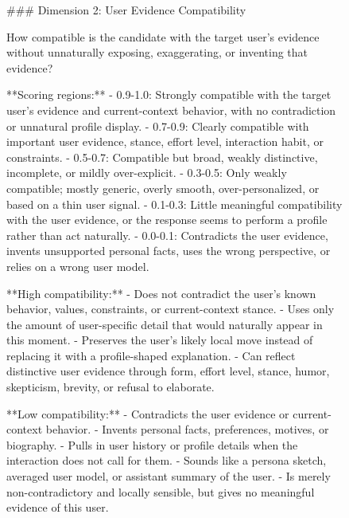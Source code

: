 \begin{figure}[p]
\centering

\begin{promptbox}
### Dimension 2: User Evidence Compatibility

How compatible is the candidate with the target user's evidence without unnaturally exposing, exaggerating, or inventing that evidence?

**Scoring regions:**
- 0.9-1.0: Strongly compatible with the target user's evidence and current-context behavior, with no contradiction or unnatural profile display.
- 0.7-0.9: Clearly compatible with important user evidence, stance, effort level, interaction habit, or constraints.
- 0.5-0.7: Compatible but broad, weakly distinctive, incomplete, or mildly over-explicit.
- 0.3-0.5: Only weakly compatible; mostly generic, overly smooth, over-personalized, or based on a thin user signal.
- 0.1-0.3: Little meaningful compatibility with the user evidence, or the response seems to perform a profile rather than act naturally.
- 0.0-0.1: Contradicts the user evidence, invents unsupported personal facts, uses the wrong perspective, or relies on a wrong user model.

**High compatibility:**
- Does not contradict the user's known behavior, values, constraints, or current-context stance.
- Uses only the amount of user-specific detail that would naturally appear in this moment.
- Preserves the user's likely local move instead of replacing it with a profile-shaped explanation.
- Can reflect distinctive user evidence through form, effort level, stance, humor, skepticism, brevity, or refusal to elaborate.

**Low compatibility:**
- Contradicts the user evidence or current-context behavior.
- Invents personal facts, preferences, motives, or biography.
- Pulls in user history or profile details when the interaction does not call for them.
- Sounds like a persona sketch, averaged user model, or assistant summary of the user.
- Is merely non-contradictory and locally sensible, but gives no meaningful evidence of this user.
\end{promptbox}
\end{figure}

